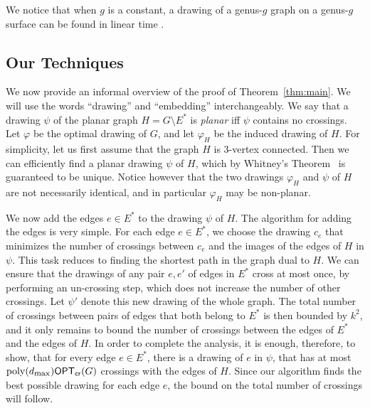\documentclass[twoside,leqno,twocolumn]{article}
\renewcommand{\phi}{\varphi}
\newcommand{\poly}{\operatorname{poly}}
\newcommand{\optcro}[1]{\mathsf{OPT}_{\mathsf{cr}}(#1)}
\newcommand{\dmax}{d_{\mbox{\textup{\footnotesize{max}}}}}
\begin{document}
We notice that when $g$ is a constant, a drawing of a genus-$g$ graph on a genus-$g$ surface can be found in linear time \cite{Mohar99, KawarabayashiMR08}.


\subsection{Our Techniques}
We now provide an informal overview of the proof of Theorem~\ref{thm:main}. We will use the words ``drawing'' and ``embedding'' interchangeably.
We say that a drawing $\psi$ of the planar graph $H=G\setminus E^*$ is \emph{planar} iff $\psi$ contains no crossings. Let $\phi$ be the optimal drawing of $G$, and let $\phi_H$ be the induced drawing of $H$.
For simplicity, let us first assume that the graph $H$ is $3$-vertex connected. 
Then we can efficiently find a planar drawing $\psi$ of $H$, which by Whitney's Theorem~\cite{Whitney} is guaranteed to be unique.
Notice however that the two drawings $\phi_H$ and $\psi$ of $H$ are not necessarily identical, and in particular $\phi_H$ may be non-planar. 

We now add the edges $e\in E^*$ to the drawing $\psi$ of $H$. The algorithm for adding the edges is very simple. 
For each edge $e\in E^*$, we  choose the drawing $c_e$ that minimizes the number of crossings between $c_e$ and the images of the edges of $H$ in $\psi$. This task reduces to finding the shortest path in the graph dual to $H$.
We can ensure that the drawings of any pair $e,e'$ of edges in $E^*$ cross at most once, by performing an un-crossing step, which does not increase the number of other crossings. Let $\psi'$ denote this new drawing of the whole graph. The total number of crossings between pairs of edges that both belong to $E^*$ is then bounded by $k^2$, and it only remains to  bound the number of crossings between the edges of $E^*$ and the edges of $H$. In order to complete the analysis,
it is enough, therefore, to show, that for every edge $e\in E^*$, there is a drawing of $e$ in $\psi$,  
that has at most $\poly(\dmax) \optcro{G}$ crossings with the edges of $H$.
Since our algorithm finds the best possible drawing for each edge $e$, the bound on the total number of crossings will follow.
\end{document}
